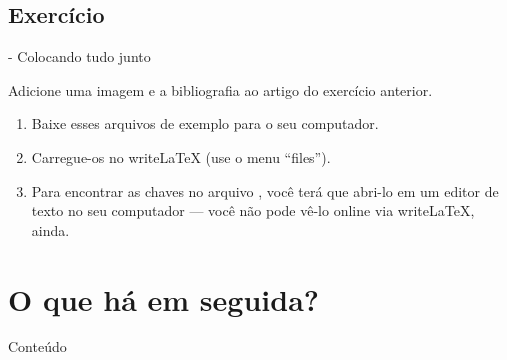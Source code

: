 \documentclass[xcolor=table]{beamer}
\begin{document}
\subsection{Exercício}
\begin{frame}[fragile]{\insertsubsection{} - Colocando tudo junto}

Adicione uma imagem e a bibliografia ao artigo do exercício anterior.


\begin{enumerate}
\item Baixe esses arquivos de exemplo para o seu computador.

\begin{center}

\end{center}

\item Carregue-os no writeLaTeX (use o menu ``files'').

\item Para encontrar as chaves no arquivo , você terá que abri-lo em um editor de texto no seu computador --- você não pode vê-lo online via writeLaTeX, ainda.

\end{enumerate}
\end{frame}

\section{O que há em seguida?}

\begin{frame}{Conteúdo}
\begin{multicols}{2}
	\tableofcontents[currentsection]
\end{multicols}
\end{frame}
\end{document}
